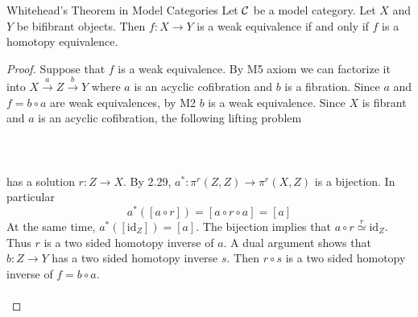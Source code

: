 \documentclass[a4paper]{article}
\begin{document}
\begin{thm}{Whitehead's Theorem in Model Categories}{} Let $\mathcal{C}$ be a model category. Let $X$ and $Y$ be bifibrant objects. Then $f:X\to Y$ is a weak equivalence if and only if $f$ is a homotopy equivalence. \tcbline
\begin{proof}
Suppose that $f$ is a weak equivalence. By M5 axiom we can factorize it into $X\overset{a}{\longrightarrow}Z\overset{b}{\longrightarrow}Y$ where $a$ is an acyclic cofibration and $b$ is a fibration. Since $a$ and $f=b\circ a$ are weak equivalences, by M2 $b$ is a weak equivalence. Since $X$ is fibrant and $a$ is an acyclic cofibration, the following lifting problem \\~\\
\\~\\ 
has a solution $r:Z\to X$. By 2.29, $a^\ast:\pi^r(Z,Z)\to\pi^r(X,Z)$ is a bijection. In particular $$a^\ast([a\circ r])=[a\circ r\circ a]=[a]$$ At the same time, $a^\ast([\text{id}_Z])=[a]$. The bijection implies that $a\circ r\overset{r}{\simeq}\text{id}_Z$. Thus $r$ is a two sided homotopy inverse of $a$. A dual argument shows that $b:Z\to Y$ has a two sided homotopy inverse $s$. Then $r\circ s$ is a two sided homotopy inverse of $f=b\circ a$. \\~\\


\end{proof}
\end{thm}
\end{document}
